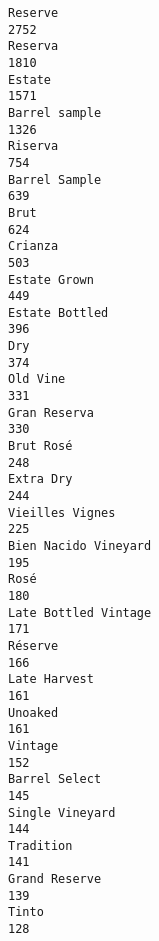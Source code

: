 \documentclass[11pt]{article}
\begin{document}
    \begin{Verbatim}[commandchars=\\\{\}]
Reserve                                                                              2752
Reserva                                                                              1810
Estate                                                                               1571
Barrel sample                                                                        1326
Riserva                                                                               754
Barrel Sample                                                                         639
Brut                                                                                  624
Crianza                                                                               503
Estate Grown                                                                          449
Estate Bottled                                                                        396
Dry                                                                                   374
Old Vine                                                                              331
Gran Reserva                                                                          330
Brut Rosé                                                                             248
Extra Dry                                                                             244
Vieilles Vignes                                                                       225
Bien Nacido Vineyard                                                                  195
Rosé                                                                                  180
Late Bottled Vintage                                                                  171
Réserve                                                                               166
Late Harvest                                                                          161
Unoaked                                                                               161
Vintage                                                                               152
Barrel Select                                                                         145
Single Vineyard                                                                       144
Tradition                                                                             141
Grand Reserve                                                                         139
Tinto                                                                                 128

\end{Verbatim}
\end{document}
